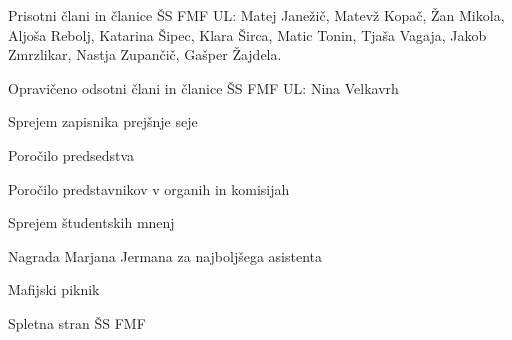 \documentclass{seja}
\begin{document}
Prisotni člani in članice ŠS FMF UL:
Matej Janežič, Matevž Kopač, Žan Mikola, Aljoša Rebolj, Katarina Šipec, Klara Širca, Matic Tonin, Tjaša Vagaja, Jakob Zmrzlikar, Nastja Zupančič, Gašper Žajdela.

Opravičeno odsotni člani in članice ŠS FMF UL:
Nina Velkavrh

\begin{red*}
	\item
	Sprejem zapisnika prejšnje seje
	\item
	Poročilo predsedstva
	\item
	Poročilo predstavnikov v organih in komisijah
    \item
    Sprejem študentskih mnenj
    \item 
    Nagrada Marjana Jermana za najboljšega asistenta
    \item
    Mafijski piknik
    \item
    Spletna stran ŠS FMF
\end{red*}
\end{document}
